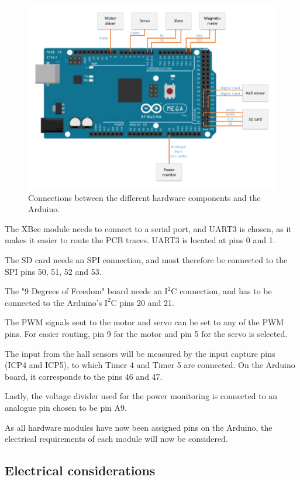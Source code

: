 \begin{figure}[H]
	\centering
	\includegraphics[scale=0.75]{figures/MegaSetup.pdf}
	\caption{Connections between the different hardware components and the Arduino.}
	\label{MegaSetup}
\end{figure}

The XBee module needs to connect to a serial port, and UART3 is chosen, as it makes it easier to route the PCB traces. UART3 is located at pins 0 and 1. 

The SD card needs an SPI connection, and must therefore be connected to the SPI pins 50, 51, 52 and 53. 

The "9 Degrees of Freedom" board needs an $\text{I}^2\text{C}$ connection, and has to be connected to the Arduino's $\text{I}^2\text{C}$ pins 20 and 21. 

The PWM signals sent to the motor and servo can be set to any of the PWM pins. For easier routing, pin 9 for the motor and pin 5 for the servo is selected.

The input from the hall sensors will be measured by the input capture pins (ICP4 and ICP5), to which Timer 4 and Timer 5 are connected. On the Arduino board, it corresponds to the pins 46 and 47.

Lastly, the voltage divider used for the power monitoring is connected to an analogue pin chosen to be pin A9.

As all hardware modules have now been assigned pins on the Arduino, the electrical requirements of each module will now be considered.

\subsection{Electrical considerations}\label{sec:elecConsiderations}

